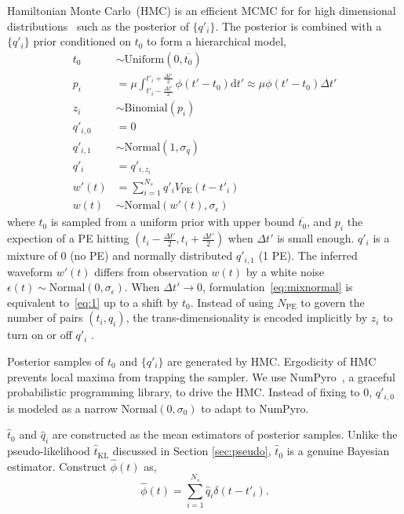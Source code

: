 Hamiltonian Monte Carlo~(HMC) is an efficient MCMC for for high dimensional distributions~\cite{neal_mcmc_2012} such as the posterior of $\{q'_i\}$.  The posterior is combined with a $\{q'_i\}$ prior conditioned on $t_0$ to form a hierarchical model,
\begin{equation}
  \begin{aligned}
    t_{0} &\sim \mathrm{Uniform}(0, \overline{t_0}) \\
    p_i &= \mu \int_{t'_i-\frac{\Delta t'}{2}}^{t'_i+\frac{\Delta t'}{2}} \phi(t' - t_0)\mathrm{d}t' \approx \mu\phi(t' - t_0)\Delta{t'}  \\
    z_i &\sim \mathrm{Binomial}(p_i) \\
    q'_{i,0}&=0\\
    q'_{i,1}& \sim \mathrm{Normal}(1, \sigma_q)\\
    q'_i &= q'_{i,z_i}\\
    w'(t) & = \sum_{i=1}^{N_s}q'_iV_\mathrm{PE}(t-t'_i)\\
    w(t) &\sim \mathrm{Normal}(w'(t), \sigma_\epsilon)
  \end{aligned}
  \label{eq:mixnormal}
\end{equation}
where $t_{0}$ is sampled from a uniform prior with upper bound $\overline{t_{0}}$, and $p_i$ the expection of a PE hitting $(t_{i} - \frac{\Delta t'}{2}, t_{i} + \frac{\Delta t'}{2})$ when $\Delta t'$ is small enough. $q'_i$ is a mixture of 0 (no PE) and normally distributed $q'_{i,1}$ (1 PE).  The inferred waveform $w'(t)$ differs from observation $w(t)$ by a white noise $\epsilon(t) \sim \mathrm{Normal}(0, \sigma_\epsilon)$.  When $\Delta{t'} \to 0$, formulation~\eqref{eq:mixnormal} is equivalent to~\eqref{eq:1} up to a shift by $t_0$.  Instead of using $N_\mathrm{PE}$ to govern the number of pairs $(t_i, q_i)$, the trans-dimensionality is encoded implicitly by $z_i$ to turn on or off $q'_i$ .

Posterior samples of $t_0$ and $\{q'_i\}$ are generated by HMC.   Ergodicity of HMC prevents local maxima from trapping the sampler.  We use NumPyro~\cite{phan2019composable}, a graceful probabilistic programming library, to drive the HMC.  Instead of fixing to 0, $q'_{i,0}$ is modeled as a narrow $\mathrm{Normal}(0, \sigma_0)$ to adapt to NumPyro.

$\hat{t}_0$ and $\hat{q}_i$ are constructed as the mean estimators of posterior samples.  Unlike the pseudo-likelihood $\hat{t}_\mathrm{KL}$ discussed in Section \ref{sec:pseudo}, $\hat{t}_0$ is a genuine Bayesian estimator.  Construct $\hat{\phi}(t)$ as,
\begin{equation}
  \label{eq:mcmc-phi}
  \hat{\phi}(t) = \sum_{i=1}^{N_s}\hat{q}_i\delta(t-t'_i).
\end{equation}


